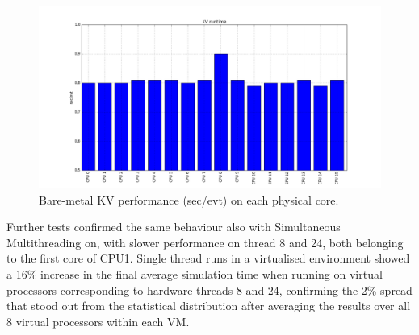 \documentclass[a4paper]{jpconf}
\begin{document}
\begin{figure}[h]
\begin{center}
\includegraphics[scale=0.3]{images/kv_runtime.png}
\end{center}
\caption{\label{kv-runtime} Bare-metal KV performance (sec/evt) on each physical core. }
\end{figure}
Further tests confirmed the same behaviour also with Simultaneous Multithreading 
on, with slower performance on thread 8 and 24, both belonging to the first core of 
CPU1. Single thread runs in a virtualised environment showed a 16\%
increase in the final average simulation time when running on virtual processors
corresponding to hardware threads 8 and 24, confirming the 2\%
spread that stood out from the statistical distribution after averaging the results
over all 8 virtual processors within each VM. 
\end{document}
